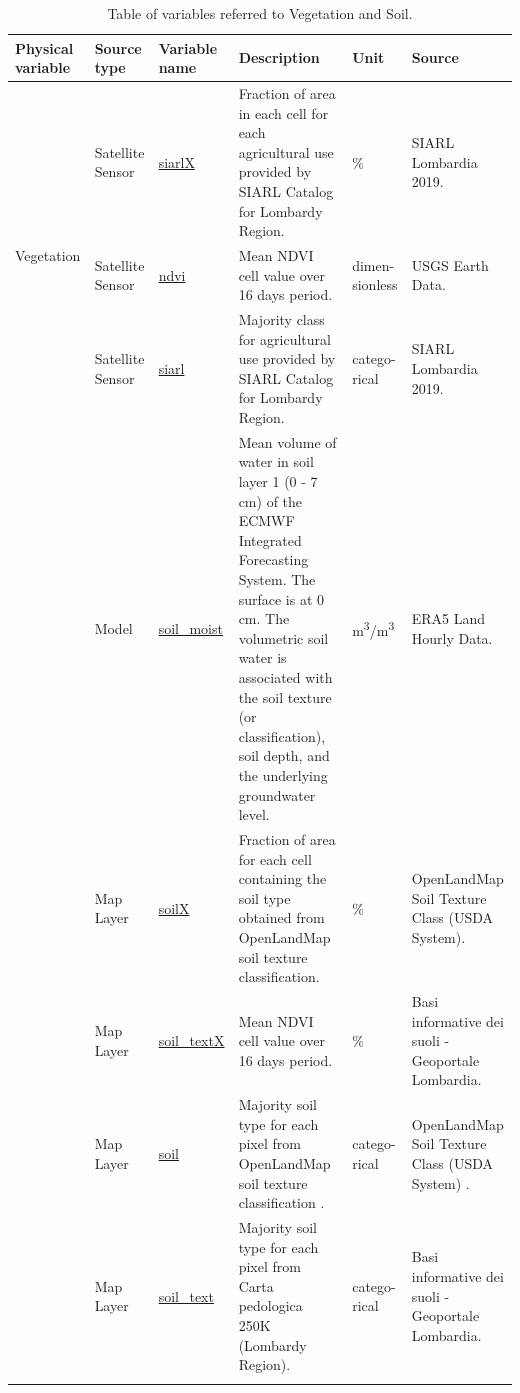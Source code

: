 \begin{center}
\setlength{\arrayrulewidth}{1.5pt}
\begin{longtable}{ |p{2.3cm}|p{1.5cm}|p{2.3cm}|p{4cm}|p{1.3cm}|p{2.5cm}| } 
\hline
\textbf{Physical variable} & \textbf{Source type}  & \textbf{Variable name}  & \textbf{Description}  & \textbf{Unit}  & \textbf{Source}\\ 
\hline

\multirow{3}{4em}{Vegetation} & Satellite \newline Sensor  & \underline{siarlX} & Fraction of area in each cell for each agricultural use provided by SIARL Catalog for Lombardy Region.\par & \% & SIARL Lombardia 2019.\\ 
& Satellite \newline Sensor  & \underline{ndvi} &  Mean NDVI cell value over 16 days period.\par & dimen-\newline sionless & USGS Earth Data.\\ 
& Satellite \newline Sensor  & \underline{siarl} &  Majority class for agricultural use provided by SIARL Catalog for Lombardy Region. \par &catego-\newline rical& SIARL Lombardia 2019.\\
\hline
\pagebreak
\hline
\multirow{5}{4em}{Soil} & Model  & \underline{soil\_moist} & Mean volume of water in soil layer 1 (0 - 7 cm) of the ECMWF Integrated Forecasting System. The surface is at 0 cm. The volumetric soil water is associated with the soil texture (or classification), soil depth, and the underlying groundwater level.\par & m\textsuperscript{3}/m\textsuperscript{3} & ERA5 Land Hourly Data.\\ 
& Map Layer  & \underline{soilX} &  Fraction of area for each cell containing the soil type obtained from OpenLandMap soil texture classification.\par & \% & OpenLandMap Soil Texture Class (USDA System).\\ 
& Map Layer  & \underline{soil\_textX} &  Mean NDVI cell value over 16 days period. \par & \% & Basi informative dei suoli - Geoportale Lombardia.\\ 
& Map Layer  & \underline{soil} &  Majority soil type for each pixel from OpenLandMap soil texture classification .\par &catego-\newline rical& OpenLandMap Soil Texture Class (USDA System) .\\ 
& Map Layer  & \underline{soil\_text} &  Majority soil type for each pixel from Carta pedologica 250K (Lombardy Region). \par&catego-\newline rical& Basi informative dei suoli - Geoportale Lombardia.\\ 

\hline
\caption{Table of variables referred to Vegetation and Soil.}

\end{longtable}
\end{center}

